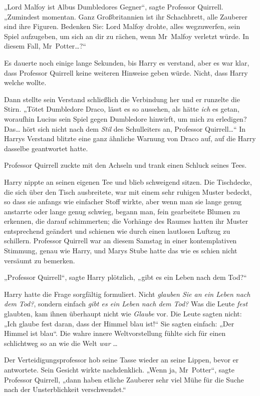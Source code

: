 {„Lord Malfoy ist Albus Dumbledores Gegner“, sagte Professor Quirrell. „Zumindest momentan. Ganz Großbritannien ist ihr Schachbrett, alle Zauberer sind ihre Figuren. Bedenken Sie: Lord Malfoy drohte, alles wegzuwerfen, sein Spiel aufzugeben, um sich an dir zu rächen, wenn Mr~Malfoy verletzt würde. In diesem Fall, Mr~Potter…?“

Es dauerte noch einige lange Sekunden, bis Harry es verstand, aber es war klar, dass Professor Quirrell keine weiteren Hinweise geben würde. Nicht, dass Harry welche wollte.

Dann stellte sein Verstand schließlich die Verbindung her und er runzelte die Stirn. „Tötet Dumbledore Draco, lässt es so aussehen, als hätte \emph{ich} es getan, woraufhin Lucius sein Spiel gegen Dumbledore hinwirft, um mich zu erledigen? Das… hört sich nicht nach dem \emph{Stil} des Schulleiters an, Professor Quirrell…“ In Harrys Verstand blitzte eine ganz ähnliche Warnung von Draco auf, auf die Harry dasselbe geantwortet hatte.

Professor Quirrell zuckte mit den Achseln und trank einen Schluck seines Tees.

Harry nippte an seinen eigenen Tee und blieb schweigend sitzen. Die Tischdecke, die sich über den Tisch ausbreitete, war mit einem sehr ruhigen Muster bedeckt, so dass sie anfangs wie einfacher Stoff wirkte, aber wenn man sie lange genug anstarrte oder lange genug schwieg, begann man, fein gearbeitete Blumen zu erkennen, die darauf schimmerten; die Vorhänge des Raumes hatten ihr Muster entsprechend geändert und schienen wie durch einen lautlosen Luftzug zu schillern. Professor Quirrell war an diesem Samstag in einer kontemplativen Stimmung, genau wie Harry, und Marys Stube hatte das wie es schien nicht versäumt zu bemerken.

„Professor Quirrell“, sagte Harry plötzlich, „gibt es ein Leben nach dem Tod?“

Harry hatte die Frage sorgfältig formuliert. Nicht \emph{glauben Sie an ein Leben nach dem} \emph{Tod?}, sondern einfach \emph{gibt es ein Leben nach dem Tod?} Was die Leute \emph{fest} glaubten, kam ihnen überhaupt nicht wie \emph{Glaube} vor. Die Leute sagten nicht: „Ich glaube fest daran, dass der Himmel blau ist!“ Sie sagten einfach: „Der Himmel ist blau“. Die wahre innere Weltvorstellung fühlte sich für einen schlichtweg so an wie die Welt \emph{war} …

Der Verteidigungsprofessor hob seine Tasse wieder an seine Lippen, bevor er antwortete. Sein Gesicht wirkte nachdenklich. „Wenn ja, Mr~Potter“, sagte Professor Quirrell, „dann haben etliche Zauberer sehr viel Mühe für die Suche nach der Unsterblichkeit verschwendet.“

}
